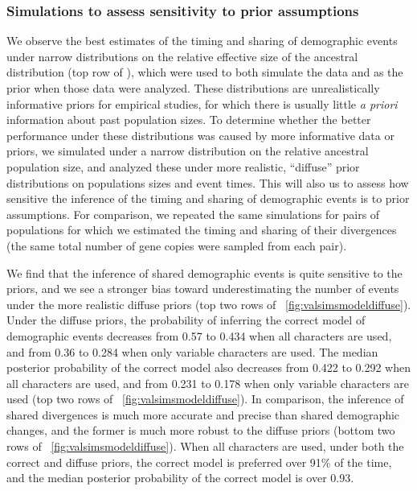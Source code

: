 \ifembed{

}{}

\ifembed{

}{}


\subsubsection{Simulations to assess sensitivity to prior assumptions}

We observe the best estimates of the timing and sharing of demographic
events under narrow distributions on the relative effective size of the
ancestral distribution
(top row of \figs
{}),
which were used to both simulate the data and as the prior
when those data were analyzed.
These distributions are unrealistically informative priors for empirical
studies, for which there is usually little \emph{a priori} information about
past population sizes.
To determine whether the better performance under these distributions was
caused by more informative data or priors, we simulated \datasets under a
narrow distribution on the relative ancestral population size, and analyzed
these \datasets under more realistic, ``diffuse'' prior distributions on
populations sizes and event times.
This will also us to assess how sensitive the inference of the timing
and sharing of demographic events is to prior assumptions.
For comparison, we repeated the same simulations for pairs of populations for
which we estimated the timing and sharing of their divergences (the same total
number of gene copies were sampled from each pair).


We find that the inference of shared demographic events is quite sensitive to
the priors, and we see a stronger bias toward underestimating the number of
events under the more realistic diffuse priors
(top two rows of \fig{}~\ref{fig:valsimsmodeldiffuse}).
Under the diffuse priors, the probability of inferring the correct model of
demographic events decreases from 0.57 to 0.434 when all characters are used,
and from 0.36 to 0.284 when only variable characters are used.
The median posterior probability of the correct model also decreases from
0.422 to 0.292 when all characters are used,
and from 0.231 to 0.178 when only variable characters are used
(top two rows of \fig{}~\ref{fig:valsimsmodeldiffuse}).
In comparison, the inference of shared divergences is much more
accurate and precise than shared demographic changes, and
the former is much more robust to the diffuse priors
(bottom two rows of \fig{}~\ref{fig:valsimsmodeldiffuse}).
When all characters are used, under both the correct and diffuse
priors, the correct model is preferred over 91\% of the time,
and the median posterior probability of the correct model is over
0.93.

